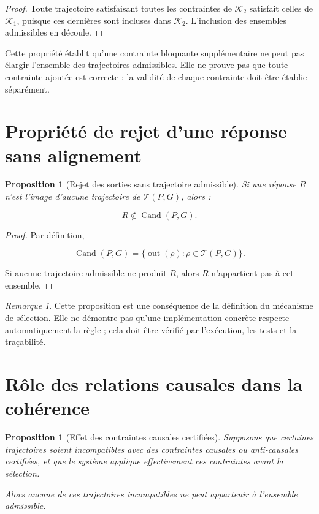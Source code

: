 \documentclass[11pt,a4paper,oneside]{book}
\newtheorem{proposition}[definition]{Proposition}
\theoremstyle{remark}
\newtheorem{remarque}[definition]{Remarque}
\DeclareMathOperator{\Cand}{Cand}
\begin{document}
\begin{proof}
Toute trajectoire satisfaisant toutes les contraintes de
\(\mathcal{K}_2\) satisfait celles de \(\mathcal{K}_1\), puisque
ces dernières sont incluses dans \(\mathcal{K}_2\).
L'inclusion des ensembles admissibles en découle.
\end{proof}

Cette propriété établit qu'une contrainte bloquante supplémentaire
ne peut pas élargir l'ensemble des trajectoires admissibles. Elle
ne prouve pas que toute contrainte ajoutée est correcte : la
validité de chaque contrainte doit être établie séparément.

\section{Propriété de rejet d'une réponse sans alignement}

\begin{proposition}[Rejet des sorties sans trajectoire admissible]
Si une réponse \(R\) n'est l'image d'aucune trajectoire de
\(\mathcal{T}(P,G)\), alors :

\[
R\notin\Cand(P,G).
\]

\end{proposition}

\begin{proof}
Par définition,

\[
\Cand(P,G)
=
\{\operatorname{out}(\rho):
\rho\in\mathcal{T}(P,G)\}.
\]

Si aucune trajectoire admissible ne produit \(R\), alors \(R\)
n'appartient pas à cet ensemble.
\end{proof}

\begin{remarque}
Cette proposition est une conséquence de la définition du mécanisme
de sélection. Elle ne démontre pas qu'une implémentation concrète
respecte automatiquement la règle ; cela doit être vérifié par
l'exécution, les tests et la traçabilité.
\end{remarque}

\section{Rôle des relations causales dans la cohérence}

\begin{proposition}[Effet des contraintes causales certifiées]
Supposons que certaines trajectoires soient incompatibles avec
des contraintes causales ou anti-causales certifiées, et que le
système applique effectivement ces contraintes avant la sélection.

Alors aucune de ces trajectoires incompatibles ne peut appartenir
à l'ensemble admissible.

\end{proposition}
\end{document}
